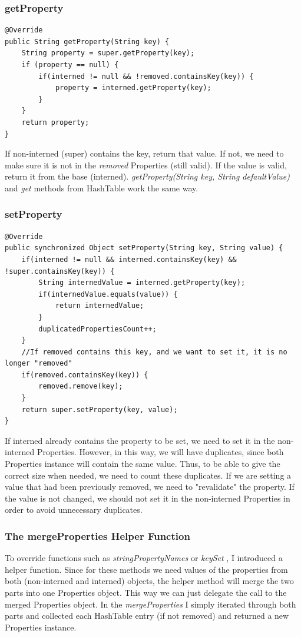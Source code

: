 \subsubsection{getProperty}
\begin{lstlisting}
@Override
public String getProperty(String key) {
	String property = super.getProperty(key);
	if (property == null) {
		if(interned != null && !removed.containsKey(key)) {
			property = interned.getProperty(key);
		}
	}
	return property;
}
\end{lstlisting}

If non-interned (super) contains the key, return that value. If not, we need to make sure it is not in the \textit{removed} Properties (still valid). If the value is valid, return it from the base (interned). \textit{getProperty(String key, String defaultValue)} and \textit{get} methods from HashTable work the same way. 
\subsubsection{setProperty}
\begin{lstlisting}
@Override
public synchronized Object setProperty(String key, String value) {
	if(interned != null && interned.containsKey(key) && !super.containsKey(key)) {
		String internedValue = interned.getProperty(key);
		if(internedValue.equals(value)) {
			return internedValue;
		}
		duplicatedPropertiesCount++;
	}
	//If removed contains this key, and we want to set it, it is no longer "removed"
	if(removed.containsKey(key)) {
		removed.remove(key);
	}
	return super.setProperty(key, value);
}
\end{lstlisting}

If interned already contains the property to be set, we need to set it in the non-interned Properties. However, in this way, we will have duplicates, since both Properties instance will contain the same value. Thus, to be able to give the correct size when needed, we need to count these duplicates. If we are setting a value that had been previously removed, we need to "revalidate" the property. If the value is not changed, we should not set it in the non-interned Properties in order to avoid unnecessary duplicates. 

\subsubsection{The mergeProperties Helper Function}
To override functions such as \textit{stringPropertyNames} or \textit{keySet} \etc, I introduced a helper function. Since for these methods we need values of the properties from both (non-interned and interned) objects, the helper method will merge the two parts into one Properties object. This way we can just delegate the call to the merged Properties object. In the \textit{mergeProperties} I simply iterated through both parts and collected each HashTable entry (if not removed) and returned a new Properties instance. 

